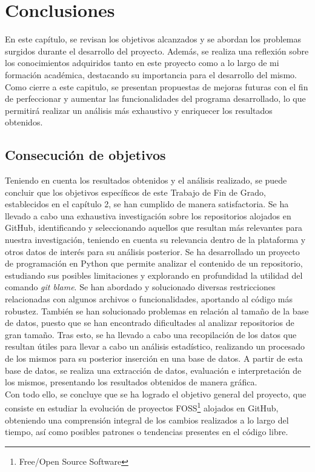 \documentclass[a4paper, 12pt]{book}
\begin{document}

\cleardoublepage
\chapter{Conclusiones}
\label{chap:conclusiones}

En este capítulo, se revisan los objetivos alcanzados y se abordan los problemas surgidos durante el desarrollo del proyecto. Además, se realiza una
reflexión sobre los conocimientos adquiridos tanto en este proyecto como a lo largo de mi formación académica, destacando su importancia para el
desarrollo del mismo. Como cierre a este capitulo, se presentan propuestas de mejoras futuras con el fin de perfeccionar y aumentar las funcionalidades
del programa desarrollado, lo que permitirá realizar un análisis más exhaustivo y enriquecer los resultados obtenidos.

\section{Consecución de objetivos}
\label{sec:consecucion-objetivos}

Teniendo en cuenta los resultados obtenidos y el análisis realizado, se puede concluir que los objetivos específicos de este Trabajo de Fin de Grado, establecidos
en el capítulo 2, se han cumplido de manera satisfactoria. Se ha llevado a cabo una exhaustiva investigación sobre los repositorios alojados en GitHub, identificando
y seleccionando aquellos que resultan más relevantes para nuestra investigación, teniendo en cuenta su relevancia dentro de la plataforma y otros datos de interés para
su análisis posterior. Se ha desarrollado un proyecto de programación en Python que permite analizar el contenido de un repositorio, estudiando sus posibles limitaciones
y explorando en profundidad la utilidad del comando \textit{git blame}. Se han abordado y solucionado diversas restricciones relacionadas con algunos archivos o funcionalidades,
aportando al código más robustez. También se han solucionado problemas en relación al tamaño de la base de datos, puesto que se han encontrado dificultades al analizar 
repositorios de gran tamaño. Tras esto, se ha llevado a cabo una recopilación de los datos que resultan útiles para llevar a cabo un análisis estadístico, realizando un
procesado de los mismos para su posterior inserción en una base de datos. A partir de esta base de datos, se realiza una extracción de datos, evaluación e interpretación
de los mismos, presentando los resultados obtenidos de manera gráfica.
\\Con todo ello, se concluye que se ha logrado el objetivo general del proyecto, que consiste en estudiar la evolución de proyectos FOSS\footnote{Free/Open Source Software}
 alojados en GitHub, obteniendo una comprensión integral de los cambios realizados a lo largo del tiempo, así como posibles patrones o tendencias  presentes en el código libre.
\end{document}

